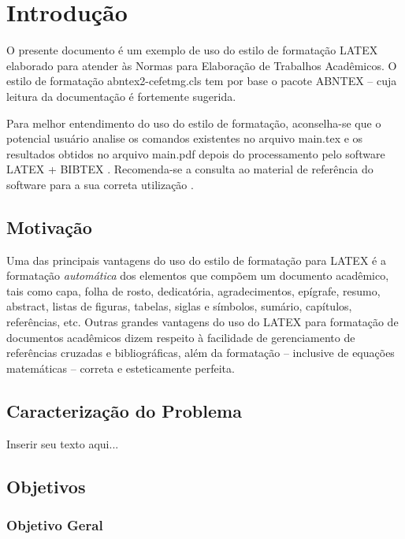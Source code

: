 %
%

\chapter{Introdução}\label{chap:introducao}

O presente documento é um exemplo de uso do estilo de formatação LATEX elaborado para atender às Normas para Elaboração de Trabalhos Acadêmicos. O estilo de formatação {\ttfamily abntex2-cefetmg.cls} tem por base o pacote ABNTEX -- cuja leitura da documentação \cite{abnTeX2009} é fortemente sugerida.

Para melhor entendimento do uso do estilo de formatação, aconselha-se que o potencial usuário analise os comandos existentes no arquivo {\ttfamily main.tex} e os resultados obtidos no arquivo {\ttfamily main.pdf} depois do processamento pelo software LATEX + BIBTEX \cite{LaTeX2009,BibTeX2009}. Recomenda-se a consulta ao material de referência do software para a sua correta utilização \cite{Lamport1986,Buerger1989,Kopka2003,Mittelbach2004}.

\section{Motivação}
\label{sec:motivacao}

Uma das principais vantagens do uso do estilo de formatação para LATEX é a formatação \textit{automática} dos elementos que compõem um documento acadêmico, tais como capa, folha de rosto, dedicatória, agradecimentos, epígrafe, resumo, abstract, listas de figuras, tabelas, siglas e símbolos, sumário, capítulos, referências, etc. Outras grandes vantagens do uso do LATEX para formatação de documentos acadêmicos dizem respeito à facilidade de gerenciamento de referências cruzadas e bibliográficas, além da formatação -- inclusive de equações matemáticas -- correta e esteticamente perfeita.

\section{Caracterização do Problema}
\label{sec:caracProblema}

Inserir seu texto aqui...

\section{Objetivos}
\label{sec:objetivos}

\subsection{Objetivo Geral}
\label{subsec:objetivoGeral}

